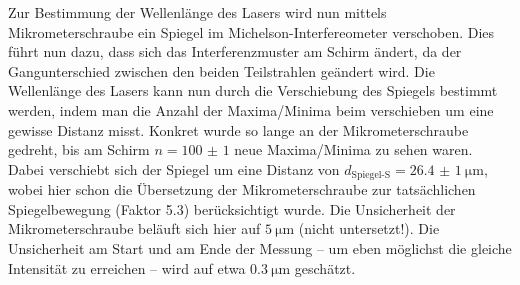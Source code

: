 \documentclass[ngerman]{scrartcl}
\begin{document}
\setcaphanging
%
Zur Bestimmung der Wellenlänge des Lasers wird nun mittels Mikrometerschraube ein Spiegel im Michelson-Interfereometer verschoben. Dies führt nun dazu, dass sich das Interferenzmuster am Schirm ändert, da der Gangunterschied zwischen den beiden Teilstrahlen geändert wird. Die Wellenlänge des Lasers kann nun durch die Verschiebung des Spiegels bestimmt werden, indem man die Anzahl der Maxima/Minima beim verschieben um eine gewisse Distanz misst. Konkret wurde so lange an der Mikrometerschraube gedreht, bis am Schirm $n = \num{100(1)}$ neue Maxima/Minima zu sehen waren. Dabei verschiebt sich der Spiegel um eine Distanz von $d_\text{Spiegel-S} = \SI{26.4(10)}{\micro\meter}$, wobei hier schon die Übersetzung der Mikrometerschraube zur tatsächlichen Spiegelbewegung (Faktor \num{5.3}) berücksichtigt wurde. Die Unsicherheit der Mikrometerschraube beläuft sich hier auf $\SI{5}{\micro\meter}$ (nicht untersetzt!). Die Unsicherheit am Start und am Ende der Messung -- um eben möglichst die gleiche Intensität zu erreichen -- wird auf etwa $\SI{0.3}{\micro\meter}$ geschätzt.
\end{document}
